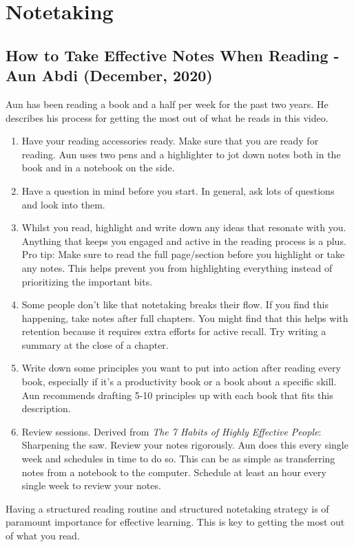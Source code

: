 \section{Notetaking}

\subsection{ How to Take Effective Notes When Reading - Aun Abdi (December, 2020) }

Aun has been reading a book and a half per week for the past two years. He describes his process for getting the most out of what he reads in this video. 
\begin{enumerate}
	\item Have your reading accessories ready. Make sure that you are ready for reading. Aun uses two pens and a highlighter to jot down notes both in the book and in a notebook on the side. 
	\item Have a question in mind before you start. In general, ask lots of questions and look into them. 
	\item Whilst you read, highlight and write down any ideas that resonate with you. Anything that keeps you engaged and active in the reading process is a plus. Pro tip: Make sure to read the full page/section before you highlight or take any notes. This helps prevent you from highlighting everything instead of prioritizing the important bits. 
	\item Some people don't like that notetaking breaks their flow. If you find this happening, take notes after full chapters. You might find that this helps with retention because it requires extra efforts for active recall. Try writing a summary at the close of a chapter. 
	\item Write down some principles you want to put into action after reading every book, especially if it's a productivity book or a book about a specific skill. Aun recommends drafting 5-10 principles up with each book that fits this description.
	\item Review sessions. Derived from \emph{The 7 Habits of Highly Effective People}: Sharpening the saw. Review your notes rigorously. Aun does this every single week and schedules in time to do so. This can be as simple as transferring notes from a notebook to the computer. Schedule at least an hour every single week to review your notes. 
\end{enumerate}

Having a structured reading routine and structured notetaking strategy is of paramount importance for effective learning. This is key to getting the most out of what you read. 




